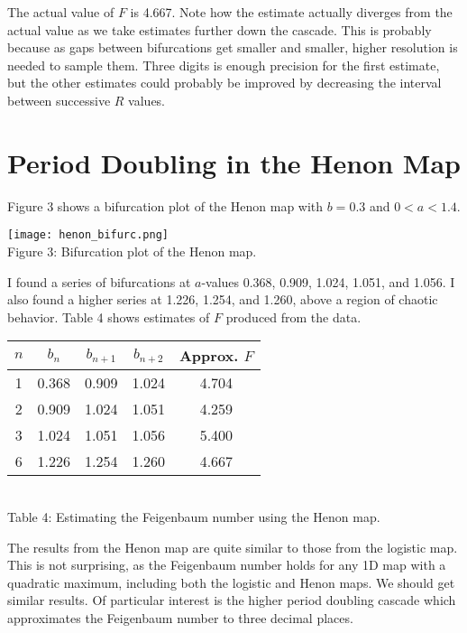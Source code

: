 \documentclass[12pt, letterpaper]{article}
\begin{document}
The actual value of $F$ is 4.667. Note how the estimate actually diverges from the 
actual value as we take estimates further down the cascade. This is probably 
because as gaps between bifurcations get smaller and smaller, higher resolution is 
needed to sample them. Three digits is enough precision for the first estimate, but 
the other estimates could probably be improved by decreasing the interval between
successive $R$ values.

\section*{Period Doubling in the Henon Map}

Figure 3 shows a bifurcation plot of the Henon map with $b = 0.3$ and $0 < a < 
1.4$. 

\begin{center}
\texttt{[image: henon\_bifurc.png]}
\\
Figure 3: Bifurcation plot of the Henon map.
\end{center}

I found a series of bifurcations at $a$-values 0.368, 0.909, 1.024, 1.051, and 
1.056. I also found a higher series at 1.226, 1.254, and 1.260, above a region 
of chaotic behavior. Table 4 shows estimates of $F$ produced from the data.

\begin{center}
\begin{tabular}{c | c | c | c | c}
$n$ & $b_n$ & $b_{n+1}$ & $b_{n+2}$ & Approx. $F$ \\ \hline
1 & 0.368 & 0.909 & 1.024 & 4.704 \\
2 & 0.909 & 1.024 & 1.051 & 4.259 \\
3 & 1.024 & 1.051 & 1.056 & 5.400 \\
6 & 1.226 & 1.254 & 1.260 & 4.667
\end{tabular}
\\
\vspace{1.0em}
Table 4: Estimating the Feigenbaum number using the Henon map.
\end{center}

The results from the Henon map are quite similar to those from the logistic map.
This is not surprising, as the Feigenbaum number holds for any 1D map with a 
quadratic maximum, including both the logistic and Henon maps. We should get
similar results. Of particular interest is the higher period doubling cascade 
which approximates the Feigenbaum number to three decimal places.
\end{document}
